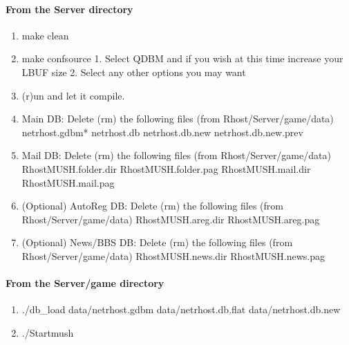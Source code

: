\documentclass[letterpaper,10pt,english]{sphinxmanual}
\begin{document}
\paragraph{From the Server directory}
\label{\detokenize{upgrade:from-the-server-directory}}\begin{enumerate}
%
\item {} 
\sphinxAtStartPar
make clean

\item {} 
\sphinxAtStartPar
make confsource
1.  Select QDBM and if you wish at this time increase your LBUF size
2.  Select any other options you may want

\item {} 
\sphinxAtStartPar
(r)un and let it compile.

\item {} 
\sphinxAtStartPar
Main DB: Delete (rm) the following files (from Rhost/Server/game/data)
netrhost.gdbm*
netrhost.db
netrhost.db.new
netrhost.db.new.prev

\item {} 
\sphinxAtStartPar
Mail DB: Delete (rm) the following files (from Rhost/Server/game/data)
RhostMUSH.folder.dir
RhostMUSH.folder.pag
RhostMUSH.mail.dir
RhostMUSH.mail.pag

\item {} 
\sphinxAtStartPar
(Optional) AutoReg DB: Delete (rm) the following files (from Rhost/Server/game/data)
RhostMUSH.areg.dir
RhostMUSH.areg.pag

\item {} 
\sphinxAtStartPar
(Optional) News/BBS DB: Delete (rm) the following files (from Rhost/Server/game/data)
RhostMUSH.news.dir
RhostMUSH.news.pag

\end{enumerate}


\paragraph{From the Server/game directory}
\label{\detokenize{upgrade:from-the-server-game-directory}}\begin{enumerate}
%
\item {} 
\sphinxAtStartPar
./db\_load data/netrhost.gdbm data/netrhost.db.flat data/netrhost.db.new

\item {} 
\sphinxAtStartPar
./Startmush

\end{enumerate}
\end{document}
